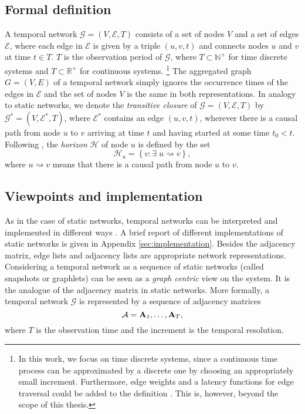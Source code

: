 \subsection{Formal definition}
A temporal network $\mathcal{G}=(V,\mathcal{E},T)$ consists of a set of nodes $V$ and a set of edges $\mathcal{E}$, where each edge in $\mathcal{E}$ is given by a triple $(u,v,t)$ and connects nodes $u$ and $v$ at time $t\in T$.
$T$ is the observation period of $\mathcal{G}$, where $T\subset \mathbb{N}^+$ for time discrete systems and $T\subset \mathbb{R}^+$ for continuous systems.
\footnote{
In this work, we focus on time discrete systems, since a continuous time process can be approximated by a discrete one by choosing an appropriately small increment.
Furthermore, edge weights and a latency functions for edge traversal could be added to the definition \citep{Casteights_review}.
This is, however, beyond the scope of this thesis.
}
The aggregated graph $G=(V,E)$ of a temporal network simply ignores the occurrence times of the edges in $\mathcal{E}$ and the set of nodes $V$ is the same in both representations.
%
In analogy to static networks, we denote the \emph{transitive closure} of $\mathcal{G}=(V,\mathcal{E},T)$ by $\mathcal{G}^*=(V,\mathcal{E}^*,T)$, where $\mathcal{E}^*$ contains an edge $(u,v,t)$, wherever there is a causal path from node $u$ to $v$ arriving at time $t$ and having started at some time $t_0<t$.
%
Following \citep{Casteights_review}, the \emph{horizon} $\mathcal{H}$ of node $u$ is defined by the set
\begin{equation}\label{eq:temporal_horizon}
\mathcal{H}_u = \left\{ v: \exists \; u\rightsquigarrow v  \right\},
\end{equation}
where $ u\rightsquigarrow v $ means that there is a causal path from node $u$ to $v$.

\subsection{Viewpoints and implementation}\label{sec:tvg_viewpoints}
As in the case of static networks, temporal networks can be interpreted and implemented in different ways \citep{Casteights_review}.
A brief report of different implementations of static networks is given in Appendix \ref{sec:implementation}.
Besides the adjacency matrix, edge lists and adjacency lists are appropriate network representations.
Considering a temporal network as a sequence of static networks (called snapshots or graphlets) can be seen as a \emph{graph centric} view on the system.
It is the analogue of the adjacency matrix in static networks.
More formally, a temporal network $\mathcal{G}$ is represented by a sequence of adjacency matrices
\begin{equation}\label{eq:AdMatrixSequence}
\mathcal{A}=\mathbf{A}_1,\dots ,\mathbf{A}_T,
\end{equation}
where $T$ is the observation time and the increment is the temporal resolution.

